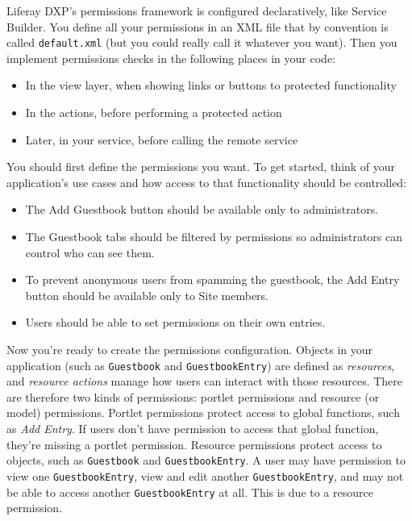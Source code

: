 Liferay DXP's permissions framework is configured declaratively, like
Service Builder. You define all your permissions in an XML file that by
convention is called \texttt{default.xml} (but you could really call it
whatever you want). Then you implement permissions checks in the
following places in your code:

\begin{itemize}
\tightlist
\item
  In the view layer, when showing links or buttons to protected
  functionality
\item
  In the actions, before performing a protected action
\item
  Later, in your service, before calling the remote service
\end{itemize}

You should first define the permissions you want. To get started, think
of your application's use cases and how access to that functionality
should be controlled:

\begin{itemize}
\item
  The Add Guestbook button should be available only to administrators.
\item
  The Guestbook tabs should be filtered by permissions so administrators
  can control who can see them.
\item
  To prevent anonymous users from spamming the guestbook, the Add Entry
  button should be available only to Site members.
\item
  Users should be able to set permissions on their own entries.
\end{itemize}

Now you're ready to create the permissions configuration. Objects in
your application (such as \texttt{Guestbook} and
\texttt{GuestbookEntry}) are defined as \emph{resources}, and
\emph{resource actions} manage how users can interact with those
resources. There are therefore two kinds of permissions: portlet
permissions and resource (or model) permissions. Portlet permissions
protect access to global functions, such as \emph{Add Entry}. If users
don't have permission to access that global function, they're missing a
portlet permission. Resource permissions protect access to objects, such
as \texttt{Guestbook} and \texttt{GuestbookEntry}. A user may have
permission to view one \texttt{GuestbookEntry}, view and edit another
\texttt{GuestbookEntry}, and may not be able to access another
\texttt{GuestbookEntry} at all. This is due to a resource permission.

